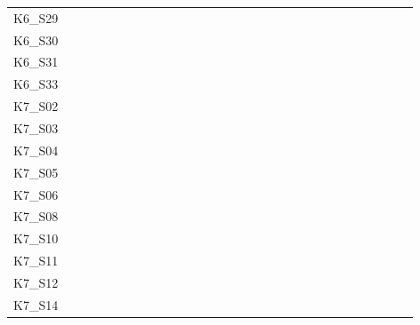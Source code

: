 \begin{table}
\begin{tabular}{l|rrrrrrrrrrrrrrrrrrrrrrrrrrrr}
        K6\_S29 & \y & \y & \y & \y & \y & \y & \y & \y & \y & \y & \y & \y & \y & \y & \y & \y & \y & \y & \y & \y & \y & \y & \y & \y & \y & \y & \y & \y \\
        K6\_S30 & \y & \y & \y & \y & \y & \y & \y & \y & \y & \y & \y & \y & \y & \y & \y & \y & \y & \y & \y & \y & \y & \y & \y & \y & \y & \y & \y & \y \\
        K6\_S31 & \y & \y & \y & \y & \y & \y & \y & \y & \y & \y & \y & \y & \y & \y & \y & \y & \y & \y & \y & \y & \y & \y & \y & \y & \y & \y & \y & \y \\
        K6\_S33 & \y & \y & \y & \y & \y & \y & \y & \x & \y & \y & \y & \y & \y & \y & \y & \y & \y & \y & \y & \y & \y & \y & \y & \y & \y & \y & \y & \y \\
        K7\_S02 & \y & \y & \y & \y & \y & \y & \y & \y & \y & \y & \y & \y & \y & \y & \y & \y & \y & \y & \y & \y & \x & \y & \y & \y & \y & \y & \x & \y \\
        K7\_S03 & \y & \y & \y & \y & \y & \y & \y & \y & \y & \y & \y & \y & \x & \y & \y & \y & \y & \y & \y & \y & \y & \y & \y & \y & \y & \y & \y & \y \\
        K7\_S04 & \y & \y & \y & \y & \y & \y & \y & \y & \y & \y & \y & \y & \y & \y & \y & \y & \y & \y & \y & \y & \y & \y & \y & \y & \y & \y & \y & \y \\
        K7\_S05 & \y & \y & \y & \y & \y & \y & \y & \y & \y & \y & \y & \y & \y & \y & \y & \y & \y & \y & \y & \y & \y & \y & \y & \y & \y & \y & \y & \y \\
        K7\_S06 & \y & \y & \y & \y & \y & \y & \y & \y & \y & \y & \y & \y & \y & \y & \y & \y & \y & \y & \y & \y & \y & \y & \y & \y & \y & \y & \y & \y \\
        K7\_S08 & \y & \y & \y & \y & \y & \y & \y & \y & \y & \y & \y & \y & \y & \y & \y & \y & \y & \y & \y & \y & \y & \y & \y & \y & \y & \y & \y & \y \\
        K7\_S10 & \y & \y & \y & \y & \y & \y & \y & \y & \y & \y & \y & \y & \y & \y & \y & \y & \y & \y & \y & \y & \x & \y & \y & \y & \y & \y & \y & \y \\
        K7\_S11 & \y & \y & \y & \y & \y & \y & \y & \y & \y & \y & \y & \y & \y & \y & \y & \y & \y & \y & \y & \y & \y & \y & \y & \y & \y & \y & \y & \y \\
        K7\_S12 & \y & \y & \y & \y & \y & \y & \y & \y & \y & \y & \y & \y & \y & \x & \y & \y & \y & \y & \y & \y & \y & \y & \y & \y & \y & \y & \y & \y \\
        K7\_S14 & \y & \y & \y & \y & \y & \y & \y & \y & \y & \y & \y & \y & \y & \y & \y & \y & \y & \y & \y & \y & \y & \y & \y & \y & \y & \y & \y & \y \\

\end{tabular}
\end{table}
